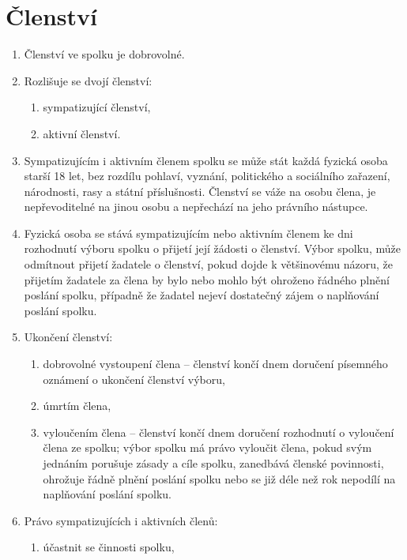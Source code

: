 \documentclass[11pt,a4paper]{article}
\begin{document}
\section{Členství}
\begin{enumerate}[itemsep=0pt]
    \item Členství ve spolku je dobrovolné.
    \item Rozlišuje se dvojí členství:
    \begin{enumerate}[itemsep=0pt,topsep=0pt]
        \item sympatizující členství,
        \item aktivní členství.
    \end{enumerate}
    \item Sympatizujícím i aktivním členem spolku se může stát každá fyzická 
    osoba starší 18 let, bez rozdílu pohlaví, vyznání, politického a sociálního 
    zařazení, národnosti, rasy a státní příslušnosti. Členství se váže na osobu 
    člena, je nepřevoditelné na jinou osobu a nepřechází na jeho 
    právního nástupce. 
    \item Fyzická osoba se stává sympatizujícím nebo aktivním členem ke dni 
    rozhodnutí výboru spolku o přijetí její žádosti o členství. Výbor spolku, 
    může odmítnout přijetí žadatele o členství, pokud dojde k většinovému 
    názoru, že přijetím žadatele za člena by bylo nebo mohlo být ohroženo 
    řádného plnění poslání spolku, případně že žadatel nejeví dostatečný zájem 
    o naplňování poslání spolku.
    \item Ukončení členství:
    \begin{enumerate}[itemsep=0pt,topsep=0pt]
        \item dobrovolné vystoupení člena – členství končí dnem doručení 
        písemného oznámení o ukončení členství výboru,
        \item úmrtím člena,
        \item vyloučením člena – členství končí dnem doručení rozhodnutí 
        o vyloučení člena ze spolku; výbor spolku má právo vyloučit člena, 
        pokud svým jednáním porušuje zásady a cíle spolku, zanedbává členské 
        povinnosti, ohrožuje řádně plnění poslání spolku nebo se již déle než 
        rok nepodílí na naplňování poslání spolku.
    \end{enumerate}
    \item Právo sympatizujících i aktivních členů:
    \begin{enumerate}[itemsep=0pt,topsep=0pt]
        \item účastnit se činnosti spolku,

\end{enumerate}
\end{enumerate}
\end{document}

